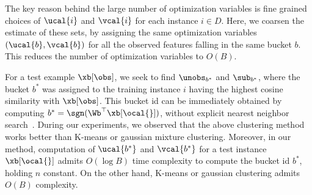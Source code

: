 \documentclass[letterpaper]{article}
\renewcommand{\cite}{\citep}
\begin{document}
The key reason behind the large number of optimization variables is   fine grained choices of $\ucal{i}$ and $\vcal{i}$ for each instance $i\in D$. 
Here, we coarsen the estimate of these sets, by assigning the same optimization variables $(\ucal{b},\vcal{b})$ for all the observed features falling in the same bucket $b$. This reduces the number of optimization variables to $O(B)$.


For a test example $\xb[\obs]$, we seek to find $\unobs_{b^*}$ and $\sub_{b^*}$, where the bucket $b^*$ was assigned to the training instance $i$ having the highest cosine similarity with $\xb[\obs]$. This bucket id can be immediately obtained by computing $b^* = \sgn(\Wb^\top \xb[\ocal{}])$, without explicit nearest neighbor search~\cite{charikar2002similarity}. 
During our experiments, we observed that the above clustering method works better than K-means or gaussian mixture clustering. Moreover, in our method, computation of $\ucal{b^*}$ and $\vcal{b^*}$ for a test instance $\xb[\ocal{}]$ admits $O(\log B )$ time complexity to compute the bucket id $b^*$, holding $n$ constant. On the other hand, K-means or gaussian clustering admits $O(B)$ complexity.





\end{document}
